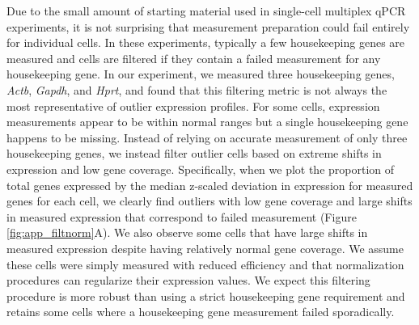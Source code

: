 \begin{subappendices}
Due to the small amount of starting material used in single-cell multiplex qPCR experiments, it is not surprising that measurement preparation could fail entirely for individual cells. In these experiments, typically a few housekeeping genes are measured and cells are filtered if they contain a failed measurement for any housekeeping gene. In our experiment, we measured three housekeeping genes, \textit{Actb}, \textit{Gapdh}, and \textit{Hprt}, and found that this filtering metric is not always the most representative of outlier expression profiles. For some cells, expression measurements appear to be within normal ranges but a single housekeeping gene happens to be missing. Instead of relying on accurate measurement of only three housekeeping genes, we instead filter outlier cells based on extreme shifts in expression and low gene coverage. Specifically, when we plot the proportion of total genes expressed by the median z-scaled deviation in expression for measured genes for each cell, we clearly find outliers with low gene coverage and large shifts in measured expression that correspond to failed measurement (Figure \ref{fig:app_filtnorm}A). We also observe some cells that have large shifts in measured expression despite having relatively normal gene coverage. We assume these cells were simply measured with reduced efficiency and that normalization procedures can regularize their expression values. We expect this filtering procedure is more robust than using a strict housekeeping gene requirement and retains some cells where a housekeeping gene measurement failed sporadically. 


\end{subappendices}
